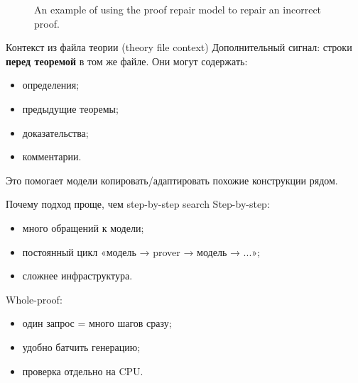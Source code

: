 \begin{figure}{}
\centering

\caption{An example of using the proof repair model to repair an incorrect proof.}
\end{figure}

\begin{frame}{Контекст из файла теории (theory file context)}
Дополнительный сигнал: строки \textbf{перед теоремой} в том же файле.
Они могут содержать:
\begin{itemize}
  \item определения;
  \item предыдущие теоремы;
  \item доказательства;
  \item комментарии.
\end{itemize}

\vspace{2mm}
Это помогает модели копировать/адаптировать похожие конструкции рядом.
\end{frame}

\begin{frame}{Почему подход проще, чем step-by-step search}
Step-by-step:
\begin{itemize}
  \item много обращений к модели;
  \item постоянный цикл «модель → prover → модель → ...»;
  \item сложнее инфраструктура.
\end{itemize}

\vspace{2mm}
Whole-proof:
\begin{itemize}
  \item один запрос = много шагов сразу;
  \item удобно батчить генерацию;
  \item проверка отдельно на CPU.
\end{itemize}
\end{frame}